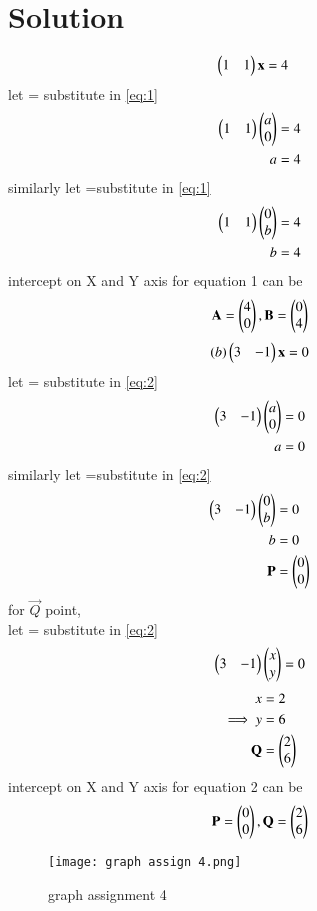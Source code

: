 \documentclass[journal,12pt,twocolumn]{IEEEtran}
\begin{document}
\section{Solution}
\begin{align}\label{eq:1}
 \begin{pmatrix}1&1\end{pmatrix}\mathbf{x}&=4
 \end{align}
let = substitute in \eqref{eq:1}
\begin{align}
  \begin{pmatrix}1&1\end{pmatrix}\begin{pmatrix}a\\0\end{pmatrix}&=4\\
a&=4
\end{align}
similarly let =substitute in \eqref{eq:1}
\begin{align}
\begin{pmatrix}1&1\end{pmatrix}\begin{pmatrix}0\\b\end{pmatrix}&=4\\
b&=4
\end{align}
intercept on X and Y axis for equation 1 can be
$$\mathbf{A}=\begin{pmatrix}4\\0\end{pmatrix}, \mathbf{B}=\begin{pmatrix}0\\4\end{pmatrix}$$
\begin{align}\label{eq:2}
(b)\begin{pmatrix}3&-1\end{pmatrix}\mathbf{x}=0
\end{align}
let = substitute in \eqref{eq:2}
\begin{align}
\begin{pmatrix}3&-1\end{pmatrix}\begin{pmatrix}a\\0\end{pmatrix}&=0\\
    a&=0
\end{align}
similarly let =substitute in \eqref{eq:2}
\begin{align}
\begin{pmatrix}3&-1\end{pmatrix}\begin{pmatrix}0\\b\end{pmatrix}&=0\\
b&=0\\
\mathbf{P}&=\begin{pmatrix}0\\0\end{pmatrix}
\end{align}
for $\vec{Q}$ point,\\
let = substitute in \eqref{eq:2}  
\begin{equation} \label{eq1}
\begin{pmatrix}3&-1\end{pmatrix}\begin{pmatrix}x\\y\end{pmatrix}=0
\end{equation}
\begin{align}
{x}&=2\\
\implies {y}&=6\\
\mathbf{Q}&=\begin{pmatrix}2\\6\end{pmatrix}
\end{align}
intercept on X and Y axis for equation 2 can be
$$\mathbf{P}=\begin{pmatrix}0\\0\end{pmatrix}, \mathbf{Q}=\begin{pmatrix}2\\6\end{pmatrix}$$
\begin{figure}[h]
    \centering
    \texttt{[image: graph assign 4.png]}
    \caption{graph assignment 4}
    \label{graph assign 4.png}
\end{figure}
\end{document}
